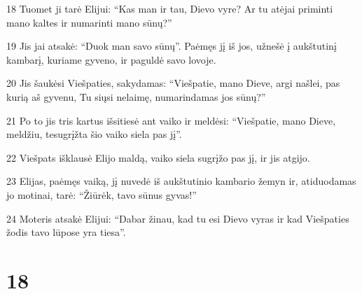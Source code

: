 \par 18 Tuomet ji tarė Elijui: “Kas man ir tau, Dievo vyre? Ar tu atėjai priminti mano kaltes ir numarinti mano sūnų?” 
\par 19 Jis jai atsakė: “Duok man savo sūnų”. Paėmęs jį iš jos, užnešė į aukštutinį kambarį, kuriame gyveno, ir paguldė savo lovoje. 
\par 20 Jis šaukėsi Viešpaties, sakydamas: “Viešpatie, mano Dieve, argi našlei, pas kurią aš gyvenu, Tu siųsi nelaimę, numarindamas jos sūnų?” 
\par 21 Po to jis tris kartus išsitiesė ant vaiko ir meldėsi: “Viešpatie, mano Dieve, meldžiu, tesugrįžta šio vaiko siela pas jį”. 
\par 22 Viešpats išklausė Elijo maldą, vaiko siela sugrįžo pas jį, ir jis atgijo. 
\par 23 Elijas, paėmęs vaiką, jį nuvedė iš aukštutinio kambario žemyn ir, atiduodamas jo motinai, tarė: “Žiūrėk, tavo sūnus gyvas!” 
\par 24 Moteris atsakė Elijui: “Dabar žinau, kad tu esi Dievo vyras ir kad Viešpaties žodis tavo lūpose yra tiesa”.



\chapter{18}

